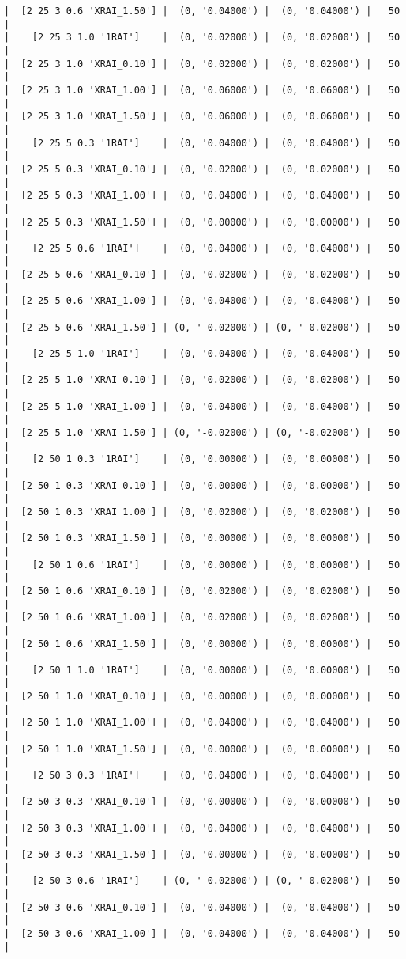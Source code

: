 \documentclass{article}
\begin{document}
\begin{verbatim}
|  [2 25 3 0.6 'XRAI_1.50'] |  (0, '0.04000') |  (0, '0.04000') |   50  |
|    [2 25 3 1.0 '1RAI']    |  (0, '0.02000') |  (0, '0.02000') |   50  |
|  [2 25 3 1.0 'XRAI_0.10'] |  (0, '0.02000') |  (0, '0.02000') |   50  |
|  [2 25 3 1.0 'XRAI_1.00'] |  (0, '0.06000') |  (0, '0.06000') |   50  |
|  [2 25 3 1.0 'XRAI_1.50'] |  (0, '0.06000') |  (0, '0.06000') |   50  |
|    [2 25 5 0.3 '1RAI']    |  (0, '0.04000') |  (0, '0.04000') |   50  |
|  [2 25 5 0.3 'XRAI_0.10'] |  (0, '0.02000') |  (0, '0.02000') |   50  |
|  [2 25 5 0.3 'XRAI_1.00'] |  (0, '0.04000') |  (0, '0.04000') |   50  |
|  [2 25 5 0.3 'XRAI_1.50'] |  (0, '0.00000') |  (0, '0.00000') |   50  |
|    [2 25 5 0.6 '1RAI']    |  (0, '0.04000') |  (0, '0.04000') |   50  |
|  [2 25 5 0.6 'XRAI_0.10'] |  (0, '0.02000') |  (0, '0.02000') |   50  |
|  [2 25 5 0.6 'XRAI_1.00'] |  (0, '0.04000') |  (0, '0.04000') |   50  |
|  [2 25 5 0.6 'XRAI_1.50'] | (0, '-0.02000') | (0, '-0.02000') |   50  |
|    [2 25 5 1.0 '1RAI']    |  (0, '0.04000') |  (0, '0.04000') |   50  |
|  [2 25 5 1.0 'XRAI_0.10'] |  (0, '0.02000') |  (0, '0.02000') |   50  |
|  [2 25 5 1.0 'XRAI_1.00'] |  (0, '0.04000') |  (0, '0.04000') |   50  |
|  [2 25 5 1.0 'XRAI_1.50'] | (0, '-0.02000') | (0, '-0.02000') |   50  |
|    [2 50 1 0.3 '1RAI']    |  (0, '0.00000') |  (0, '0.00000') |   50  |
|  [2 50 1 0.3 'XRAI_0.10'] |  (0, '0.00000') |  (0, '0.00000') |   50  |
|  [2 50 1 0.3 'XRAI_1.00'] |  (0, '0.02000') |  (0, '0.02000') |   50  |
|  [2 50 1 0.3 'XRAI_1.50'] |  (0, '0.00000') |  (0, '0.00000') |   50  |
|    [2 50 1 0.6 '1RAI']    |  (0, '0.00000') |  (0, '0.00000') |   50  |
|  [2 50 1 0.6 'XRAI_0.10'] |  (0, '0.02000') |  (0, '0.02000') |   50  |
|  [2 50 1 0.6 'XRAI_1.00'] |  (0, '0.02000') |  (0, '0.02000') |   50  |
|  [2 50 1 0.6 'XRAI_1.50'] |  (0, '0.00000') |  (0, '0.00000') |   50  |
|    [2 50 1 1.0 '1RAI']    |  (0, '0.00000') |  (0, '0.00000') |   50  |
|  [2 50 1 1.0 'XRAI_0.10'] |  (0, '0.00000') |  (0, '0.00000') |   50  |
|  [2 50 1 1.0 'XRAI_1.00'] |  (0, '0.04000') |  (0, '0.04000') |   50  |
|  [2 50 1 1.0 'XRAI_1.50'] |  (0, '0.00000') |  (0, '0.00000') |   50  |
|    [2 50 3 0.3 '1RAI']    |  (0, '0.04000') |  (0, '0.04000') |   50  |
|  [2 50 3 0.3 'XRAI_0.10'] |  (0, '0.00000') |  (0, '0.00000') |   50  |
|  [2 50 3 0.3 'XRAI_1.00'] |  (0, '0.04000') |  (0, '0.04000') |   50  |
|  [2 50 3 0.3 'XRAI_1.50'] |  (0, '0.00000') |  (0, '0.00000') |   50  |
|    [2 50 3 0.6 '1RAI']    | (0, '-0.02000') | (0, '-0.02000') |   50  |
|  [2 50 3 0.6 'XRAI_0.10'] |  (0, '0.04000') |  (0, '0.04000') |   50  |
|  [2 50 3 0.6 'XRAI_1.00'] |  (0, '0.04000') |  (0, '0.04000') |   50  |

\end{verbatim}
\end{document}
